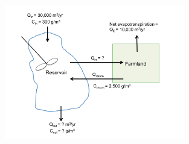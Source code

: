 \documentclass[11pt,letterpaper]{article}
\begin{document}
\begin{figure}
\centering
\includegraphics[width=0.7\textwidth]{massbalance_farm}
\end{figure}
\end{document}
